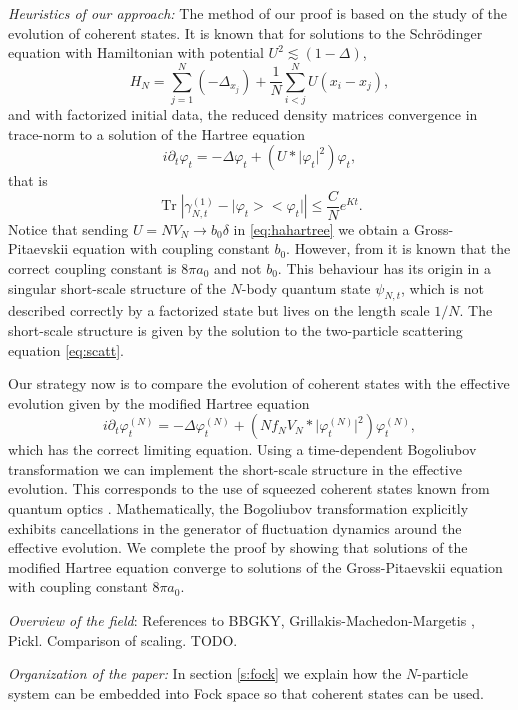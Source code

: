 \documentclass[11pt,a4paper,draft,DIV11]{scrartcl}	%
\newcommand{\ph}{\varphi_t^{(N)}}	%
\newcommand{\project}[1]{\lvert #1 \big>\big< #1\rvert}	%
\newcommand{\Tr}{\operatorname{Tr}}	%
\newcommand{\be}[1]{\begin{equation}\label{eq:#1}}	%
\newcommand{\ee}{\end{equation}}
\newcommand{\eqr}[1]{\eqref{eq:#1}}			%
\begin{document}
\emph{Heuristics of our approach:} 
The method of our proof is based on the study of the evolution of coherent
states. It is known \cite{RS2009, CLS2011} that for solutions to the Schr\"odinger equation with Hamiltonian with potential $U^2 \apprle (1-\Delta)$,
\[
H_N = \sum_{j=1}^N (-\Delta_{x_j}) + \frac{1}{N}\sum_{i<j}^N U(x_i-x_j),
\]
and with factorized initial data, the reduced density matrices convergence in trace-norm to a solution of the Hartree equation
\be{hahartree}
i \partial_t \varphi_t = -\Delta \varphi_t + \left(U \ast \lvert \varphi_t\rvert^2 \right) \varphi_t,
\ee
that is
\[
\Tr \left\lvert \gamma_{N,t}^{(1)} - \project{\varphi_t} \right\rvert \leq \frac{C}{N}e^{Kt}.
\]
Notice that sending $U = N V_N \to b_0
\delta$ in \eqr{hahartree} we obtain a Gross-Pitaevskii equation with coupling constant $b_0$.
However, from \cite{ESY2010} it is known that the correct coupling constant
is $8 \pi a_0$ and not $b_0$. %
This behaviour has its origin in a singular short-scale structure of the $N$-body
quantum state $\psi_{N,t}$, which is not described correctly by a factorized state but lives on the length scale $1/N$. The short-scale structure is given \cite{EMS2009} by the solution to the two-particle scattering equation \eqref{eq:scatt}.

Our strategy now is to compare the evolution of coherent states with the effective evolution given by the modified Hartree equation
\be{modHartreeEqu}
i \partial_t \ph = -\Delta \ph + \left(N f_N V_N \ast \lvert \ph\rvert^2 \right) \ph,
\ee
which has the correct limiting equation.
Using a time-dependent Bogoliubov transformation we can implement the short-scale structure in the effective evolution. This corresponds to the use of squeezed coherent states known from quantum optics \cite{Loudon}. Mathematically, the Bogoliubov transformation explicitly exhibits cancellations in the generator of fluctuation dynamics around the effective evolution.
We complete the proof by showing that solutions of the modified Hartree equation converge to solutions of the Gross-Pitaevskii equation with coupling constant $8\pi a_0$.
\newline

\emph{Overview of the field}: References to BBGKY, Grillakis-Machedon-Margetis \cite{GMM2010}, Pickl. Comparison of scaling. TODO.\newline

\emph{Organization of the paper:}
In section \ref{s:fock} we explain how the $N$-particle system can be embedded into Fock space so that coherent states can be used.
\end{document}
